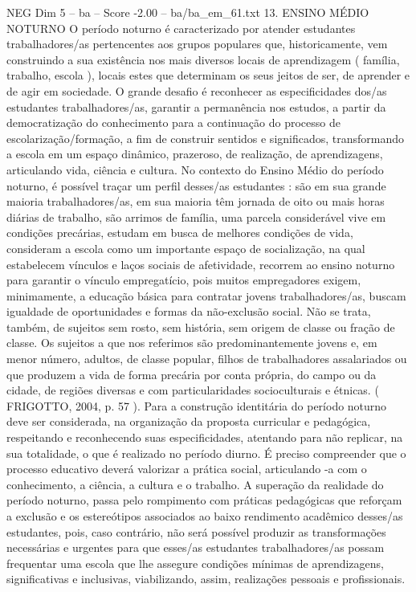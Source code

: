 \begin{textsample}{NEG Dim 5 – ba – Score -2.00 – ba/ba\_em\_61.txt}  \label{ex:f5_neg_020}
13.
ENSINO MÉDIO NOTURNO O período noturno é caracterizado por atender estudantes trabalhadores/as pertencentes aos grupos populares que, historicamente, vem construindo a sua existência nos mais diversos locais de aprendizagem ( família, trabalho, escola ), locais estes que determinam os seus jeitos de ser, de aprender e de agir em sociedade.
O grande desafio é reconhecer as especificidades dos/as estudantes trabalhadores/as, garantir a permanência nos estudos, a partir da democratização do conhecimento para a continuação do processo de escolarização/formação, a fim de construir sentidos e significados, transformando a escola em um espaço dinâmico, prazeroso, de realização, de aprendizagens, articulando vida, ciência e cultura.
No contexto do Ensino Médio do período noturno, é possível traçar um perfil desses/as estudantes : são em sua grande maioria trabalhadores/as, em sua maioria têm jornada de oito ou mais horas diárias de trabalho, são arrimos de família, uma parcela considerável vive em condições precárias, estudam em busca de melhores condições de vida, consideram a escola como um importante espaço de socialização, na qual estabelecem vínculos e laços sociais de afetividade, recorrem ao ensino noturno para garantir o vínculo empregatício, pois muitos empregadores exigem, minimamente, a educação básica para contratar jovens trabalhadores/as, buscam igualdade de oportunidades e formas da não-exclusão social.
Não se trata, também, de sujeitos sem rosto, sem história, sem origem de classe ou fração de classe.
Os sujeitos a que nos referimos são predominantemente jovens e, em menor número, adultos, de classe popular, filhos de trabalhadores assalariados ou que produzem a vida de forma precária por conta própria, do campo ou da cidade, de regiões diversas e com particularidades socioculturais e étnicas. ( FRIGOTTO, 2004, p. 57 ).
Para a construção identitária do período noturno deve ser considerada, na organização da proposta curricular e pedagógica, respeitando e reconhecendo suas especificidades, atentando para não replicar, na sua totalidade, o que é realizado no período diurno.
É preciso compreender que o processo educativo deverá valorizar a prática social, articulando -a com o conhecimento, a ciência, a cultura e o trabalho.
A superação da realidade do período noturno, passa pelo rompimento com práticas pedagógicas que reforçam a exclusão e os estereótipos associados ao baixo rendimento acadêmico desses/as estudantes, pois, caso contrário, não será possível produzir as transformações necessárias e urgentes para que esses/as estudantes trabalhadores/as possam frequentar uma escola que lhe assegure condições mínimas de aprendizagens, significativas e inclusivas, viabilizando, assim, realizações pessoais e profissionais.

\end{textsample}
